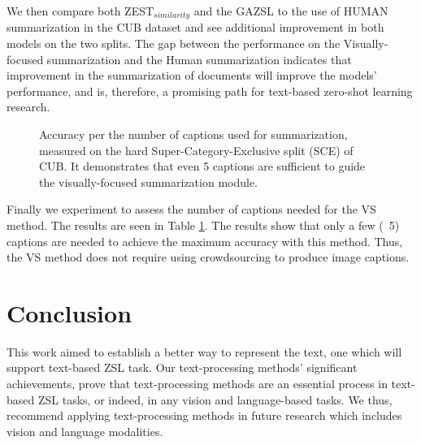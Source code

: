 \documentclass[11pt,a4paper]{article}
\begin{document}
\par
We then compare both ZEST$_{similarity}$ and the GAZSL to the use of HUMAN summarization in the CUB dataset and see additional improvement in both models on the two splits. The gap between the performance on the Visually-focused summarization and the Human summarization indicates that improvement in the summarization of documents will improve the models' performance, and is, therefore, a promising path for text-based zero-shot learning research.\par


\begin{figure}[t]
\centering
{}
 \caption{Accuracy per the number of captions used for summarization, measured on the hard Super-Category-Exclusive split (SCE) of CUB. It demonstrates that even 5 captions are sufficient to guide the visually-focused summarization module.}
\label{fig:captions}
\end{figure}


Finally we experiment to assess the number of captions needed for the VS method. The results are seen in Table \ref{fig:captions}. The results show that only a few (~5) captions are needed to achieve the maximum accuracy with this method.  Thus, the VS method does not require using crowdsourcing to produce image captions. 



\par



\section{Conclusion}
\label{conclusion}

This work aimed to establish a better way to represent the text, one which will support text-based ZSL task. Our text-processing methods' significant achievements, prove that text-processing methods are an essential process in text-based ZSL tasks, or indeed, in any vision and language-based tasks. We thus, recommend applying text-processing methods in future research which includes vision and language modalities.




\end{document}
